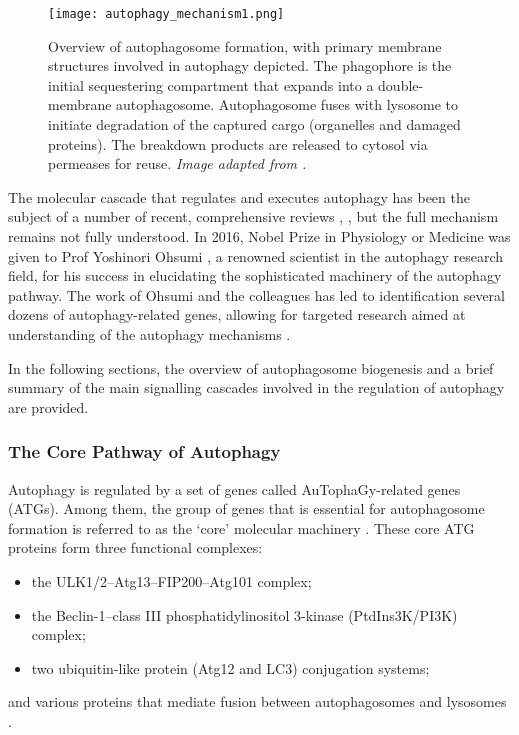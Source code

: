             \begin{figure}[!h]
            \centering
            \texttt{[image: autophagy\_mechanism1.png]}
            \caption[Overview of autophagosome formation]{Overview of autophagosome formation, with primary membrane structures involved in autophagy depicted. The phagophore is the initial sequestering compartment that expands into a double-membrane autophagosome. Autophagosome fuses with lysosome to initiate degradation of the captured cargo (organelles and damaged proteins). The breakdown products are released to cytosol via permeases for reuse. \textit{Image adapted from \cite{Feng2015}.} }
            \label{fig:autophagosome}
            \end{figure} 
            
    The molecular cascade that regulates and executes autophagy has been the subject of a number of recent, comprehensive reviews \cite{Feng2015, Abada2014}, \cite{ Fullgrabe2016, Kaur2015}, but the full mechanism remains not fully understood. In 2016, Nobel Prize in Physiology or Medicine was given to Prof Yoshinori Ohsumi \cite{The2016}, a renowned scientist in the autophagy research field, for his success in elucidating the sophisticated machinery of the autophagy pathway. The work of Ohsumi and the colleagues has led to identification several dozens of autophagy-related genes, allowing for targeted research aimed at understanding of the autophagy mechanisms \cite{Feng2015}. 

    In the following sections, the overview of autophagosome biogenesis and a brief summary of the main signalling cascades involved in the regulation of autophagy are provided. 



        \subsubsection{The Core Pathway of Autophagy }
        
        
      Autophagy is regulated by a set of genes called AuTophaGy-related genes (ATGs). Among them, the group of genes that is essential for autophagosome formation is referred to as the ‘core’ molecular machinery \cite{Xie2007}. These core ATG proteins form three functional complexes:
      \begin{itemize}
          \item the ULK1/2--Atg13--FIP200--Atg101 complex; 
          \item the Beclin-1--class III phosphatidylinositol 3-kinase (PtdIns3K/PI3K) complex; 
          \item two ubiquitin-like protein (Atg12 and LC3) conjugation systems;
    \end{itemize}
    and various proteins that mediate fusion between autophagosomes and lysosomes \cite{Feng2015, Yang2010}. 


